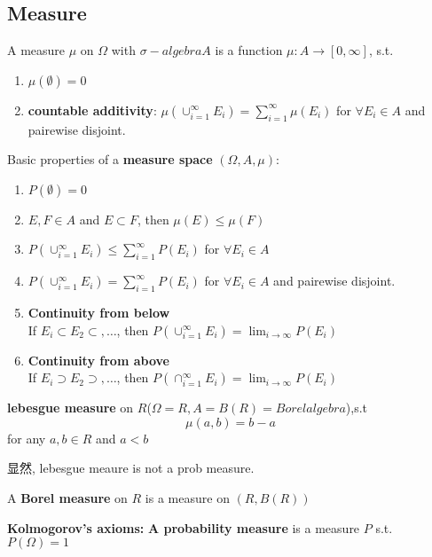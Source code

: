 \documentclass{article}
\begin{document}
\subsection{Measure}
\begin{definition}
A measure $\mu$ on $\Omega$ with $\sigma-algebra A$ is a function $\mu: A \rightarrow [0, \infty]$, s.t.
\begin{enumerate}
\item $\mu(\emptyset) = 0$
\item \textbf{countable additivity}: $\mu(\cup_{i=1}^{\infty} E_i) = \sum_{i=1}^{\infty}\mu(E_i)$ for $\forall E_i \in A$ and pairewise disjoint.
\end{enumerate}
\end{definition}

Basic properties of a \textbf{measure space} $(\Omega, A, \mu)$:
\begin{enumerate}
\item $P(\emptyset) = 0$
\item $E,F \in A$ and $E \subset F$, then $\mu(E) \leq \mu(F)$
\item $P(\cup_{i=1}^{\infty} E_i) \leq \sum_{i=1}^{\infty}P(E_i)$ for $\forall E_i \in A$
\item $P(\cup_{i=1}^{\infty} E_i) = \sum_{i=1}^{\infty}P(E_i)$ for $\forall E_i \in A$ and pairewise disjoint.
\item \textbf{Continuity from below}\\
If $E_i \subset E_2 \subset,\ldots $, then $P(\cup_{i=1}^{\infty} E_i) = \lim_{i \to \infty} P(E_i)$
\item \textbf{Continuity from above}\\
If $E_i \supset E_2 \supset,\ldots $, then $P(\cap_{i=1}^{\infty} E_i) = \lim_{i \to \infty} P(E_i)$
\end{enumerate}

\begin{definition}
\textbf{lebesgue measure} on $R$($\Omega = R, A = B(R) = Borel algebra$),s.t
$$\mu(a,b) = b -a$$ for any $a,b \in R$ and $a < b$
\end{definition}
显然, lebesgue meaure is not a prob measure.

\begin{definition}
A \textbf{Borel measure} on $R$ is a measure on $(R, B(R))$
\end{definition}

\begin{definition}
\textbf{Kolmogorov's axioms: }
\textbf{A probability measure} is a measure $P$ s.t. $P(\Omega) = 1$
\end{definition}
\end{document}
